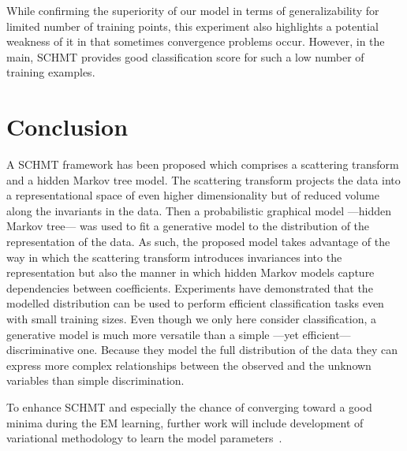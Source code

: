 \documentclass{article}
\begin{document}
    While confirming the superiority of our model in terms of generalizability for limited number of training points, this experiment also highlights a potential weakness of it in that sometimes convergence problems occur. However, in the main, SCHMT provides good classification score for such a low number of training examples.
		
\section{Conclusion}
  \label{sec:Conclusion}
  \vspace{-5pt}
  A SCHMT framework has been proposed which comprises a scattering transform and a hidden Markov tree model.  The scattering transform projects the data into a representational space of even higher dimensionality but of reduced volume along the invariants in the data. Then a probabilistic graphical model ---hidden Markov tree--- was used to fit a generative model to the distribution of the representation of the data.  As such, the proposed model takes advantage of the way in which the scattering transform introduces invariances into the representation but also the manner in which hidden Markov models capture dependencies between coefficients.  Experiments have demonstrated that the modelled distribution can be used to perform efficient classification tasks even with small training sizes. Even though we only here consider classification, a generative model is much more versatile than a simple ---yet efficient--- discriminative one. Because they model the full distribution of the data they can express more complex relationships between the observed and the unknown variables than simple discrimination. 
  
  To enhance SCHMT and especially the chance of converging toward a good minima during the EM learning, further work will include development of variational methodology to learn the model parameters~\cite{wainwright2008graphical}.

  
\vfill
\pagebreak

% 




% 
\end{document}

